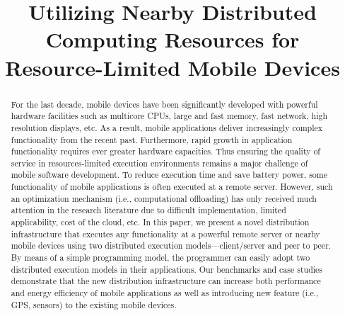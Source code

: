 \documentclass[conference]{IEEEtran}
\begin{document}
%
\title{Utilizing Nearby Distributed Computing Resources for Resource-Limited Mobile Devices}


\author{
\and
{}
}


\maketitle

\begin{abstract}
For the last decade, mobile devices have been significantly developed with powerful hardware facilities such as multicore CPUs, large and fast memory, fast network, high resolution displays, etc. As a result, mobile applications deliver increasingly complex functionality from the recent past. Furthermore, rapid growth in application functionality requires ever greater hardware capacities. Thus ensuring the quality of service in resources-limited execution environments remains a major challenge of mobile software development. To reduce execution time and save battery power, some functionality of mobile applications is often executed at a remote server. However, such an optimization mechanism (i.e., computational offloading) has only received much attention in the research literature due to difficult implementation, limited applicability, cost of the cloud, etc. In this paper, we present a novel distribution infrastructure that executes any functionality at a powerful remote server or nearby mobile devices using two distributed execution models---client/server and peer to peer. By means of a simple programming model, the programmer can easily adopt two distributed execution models in their applications. Our benchmarks and case studies demonstrate that the new distribution infrastructure can increase both performance and energy efficiency of mobile applications as well as introducing new feature (i.e., GPS, sensors) to the existing mobile devices.
\end{abstract}
\end{document}
